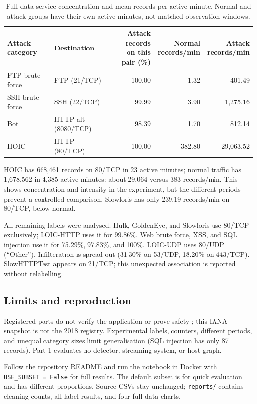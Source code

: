 \documentclass[10pt,a4paper]{article}
\begin{document}
\begin{table}[H]\centering\small
\caption{Full-data service concentration and mean records per active minute. Normal and attack groups have their own active minutes, not matched observation windows.}
\begin{tabular}{@{}llrrr@{}}
\toprule
Attack category & Destination & \shortstack{Attack records\\on this pair (\%)} & \shortstack{Normal\\records/min} & \shortstack{Attack\\records/min} \\
\midrule
FTP brute force & FTP (21/TCP) & 100.00 & 1.32 & 401.49 \\
SSH brute force & SSH (22/TCP) & 99.99 & 3.90 & 1,275.16 \\
Bot & HTTP-alt (8080/TCP) & 98.39 & 1.70 & 812.14 \\
HOIC & HTTP (80/TCP) & 100.00 & 382.80 & 29,063.52 \\
\bottomrule
\end{tabular}
\end{table}

HOIC has 668,461 records on 80/TCP in 23 active minutes; normal traffic has 1,678,562 in 4,385 active minutes: about 29,064 versus 383 records/min. This shows concentration and intensity in the experiment, but the different periods prevent a controlled comparison. Slowloris has only 239.19 records/min on 80/TCP, below normal.

All remaining labels were analysed. Hulk, GoldenEye, and Slowloris use 80/TCP exclusively; LOIC-HTTP uses it for 99.86\%. Web brute force, XSS, and SQL injection use it for 75.29\%, 97.83\%, and 100\%. LOIC-UDP uses 80/UDP (``Other''). Infilteration is spread out (31.30\% on 53/UDP, 18.20\% on 443/TCP). SlowHTTPTest appears on 21/TCP; this unexpected association is reported without relabelling.

\subsection*{Limits and reproduction}
Registered ports do not verify the application or prove safety \cite{dataset2}; this IANA snapshot is not the 2018 registry. Experimental labels, counters, different periods, and unequal category sizes limit generalisation (SQL injection has only 87 records). Part 1 evaluates no detector, streaming system, or host graph.

Follow the repository README and run the notebook in Docker with \texttt{USE\_SUBSET = False} for full results. The default subset is for quick evaluation and has different proportions. Source CSVs stay unchanged; \texttt{reports/} contains cleaning counts, all-label results, and four full-data charts.

\begingroup\small
\setlength{\bibsep}{2pt}


\endgroup
\end{document}
